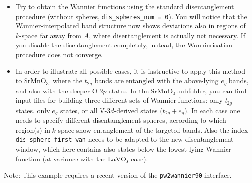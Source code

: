 \documentclass[a4paper,11pt,twoside]{article}
\begin{document}
\begin{itemize}
\item Try to obtain the Wannier functions using the standard disentanglement procedure (without spheres, \verb+dis_spheres_num = 0+). You will notice that the Wannier-interpolated band structure now shows deviations also in regions of $k$-space far away from $A$, where disentanglement is actually not necessary. If you disable the disentanglement completely, instead, the Wannierisation procedure does not converge.

\item In order to illustrate all possible cases, it is instructive to apply this method to SrMnO$_3$, where the $t_{2g}$ bands are entangled with the above-lying $e_g$ bands, and also with the deeper O-$2p$ states.
  In the SrMnO$_3$ subfolder, you can find input files for building three different sets of Wannier functions: only $t_{2g}$ states, only $e_g$ states, or all V-$3d$-derived states ($t_{2g} + e_g$). In each case one needs to specify different disentanglement spheres, according to which region(s) in $k$-space show entanglement of the targeted bands. 
  Also the index \verb+dis_sphere_first_wan+ needs to be adapted to the new disentanglement window, which here contains also states below the lowest-lying Wannier function (at variance with the LaVO$_3$ case).
\end{itemize}



Note: This example requires a recent version of the {\tt pw2wannier90} interface.
\end{document}
